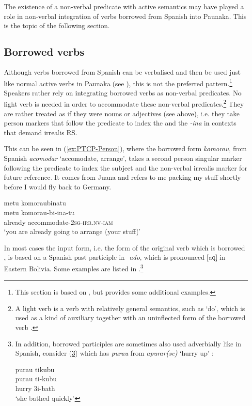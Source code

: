 The existence of a non-verbal predicate with active semantics may have played a role in non-verbal integration of verbs borrowed from Spanish into Paunaka. This is the topic of the following section.


\subsection{Borrowed verbs}\label{sec:borrowed_verbs}
Although verbs borrowed from Spanish can be verbalised and then be used just like normal active verbs in Paunaka (see ), this is not the preferred pattern.\footnote{This section is based on \citet[]{Terhart_subm}, but provides some additional examples.} Speakers rather rely on integrating borrowed verbs as non-verbal predicates. No light verb is needed in order to accommodate these non-verbal predicates.\footnote{A light verb is a verb with relatively general semantics, such as ‘do’, which is used as a kind of auxiliary together with an uninflected form of the borrowed verb \citep[102]{Wohlgemuth2009}.} They are rather treated as if they were nouns or adjectives (see  above), i.e. they take person markers that follow the predicate to index the  and the  \textit{-ina} in contexts that demand irrealis RS.

This can be seen in (\ref{ex:PTCP-Person}), where the borrowed form \textit{komorau}, from Spanish \textit{acomodar} ‘accomodate, arrange’, takes a second person singular marker following the predicate to index the subject and the non-verbal irrealis marker for future reference. It comes from Juana and refers to me packing my stuff shortly before I would fly back to Germany.

\ea\label{ex:PTCP-Person}
\begingl 
\glpreamble metu komoraubinatu\\
\gla metu komorau-bi-ina-tu\\ 
\glb already accommodate-2\textsc{sg}-\textsc{irr.nv}-\textsc{iam}\\ 
\glft ‘you are already going to arrange (your stuff)’\\ 
\endgl
\trailingcitation{[jxx-p120515l-2.275]}
\xe
{}

In most cases the input form, i.e. the form of the original verb which is borrowed \citep[cf.][]{Wohlgemuth2009}, is based on a Spanish past participle in \textit{-ado}, which is pronounced [ao̪] in Eastern Bolivia. Some examples are listed in .\footnote{In addition, borrowed participles are sometimes also used adverbially like in Spanish, consider (\ref{ex:Borri-fn}) which has \textit{purau} from \textit{apurar(se)} ‘hurry up’ : 

\ea\label{ex:Borri-fn}
\begingl
\glpreamble purau tikubu\\
\gla purau ti-kubu\\
\glb hurry 3i-bath\\
\glft ‘she bathed quickly’
\endgl
\trailingcitation{[jxx-p120515l-2.152]}
\xe}

